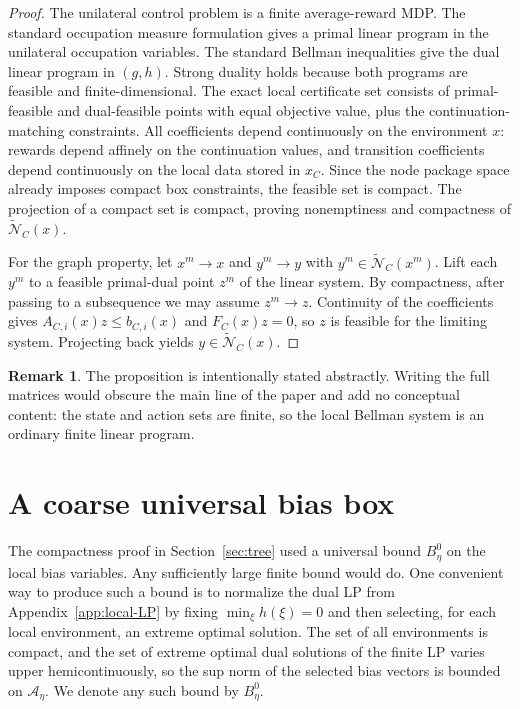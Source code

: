\documentclass[12pt]{article}
\theoremstyle{definition}
\newtheorem{remark}[theorem]{Remark}
\newcommand{\1}{\mathbf{1}}
\newcommand{\cA}{\mathcal{A}}
\newcommand{\cN}{\mathcal{N}}
\begin{document}
\begin{proof}
The unilateral control problem is a finite average-reward MDP.  The standard occupation
measure formulation gives a primal linear program in the unilateral occupation variables.
The standard Bellman inequalities give the dual linear program in \((g,h)\).  Strong
duality holds because both programs are feasible and finite-dimensional.  The exact local
certificate set consists of primal-feasible and dual-feasible points with equal objective
value, plus the continuation-matching constraints.  All coefficients depend continuously on
the environment \(x\): rewards depend affinely on the continuation values, and transition
coefficients depend continuously on the local data stored in \(x_C\).  Since the node
package space already imposes compact box constraints, the feasible set is compact.  The
projection of a compact set is compact, proving nonemptiness and compactness of
\(\widetilde{\cN}_C(x)\).

For the graph property, let \(x^m\to x\) and \(y^m\to y\) with
\(y^m\in \widetilde{\cN}_C(x^m)\).  Lift each \(y^m\) to a feasible primal-dual point
\(z^m\) of the linear system.  By compactness, after passing to a subsequence we may
assume \(z^m\to z\).  Continuity of the coefficients gives
\(A_{C,i}(x)z\le b_{C,i}(x)\) and \(F_C(x)z=0\), so \(z\) is feasible for the limiting
system.  Projecting back yields \(y\in \widetilde{\cN}_C(x)\).
\end{proof}

\begin{remark}
The proposition is intentionally stated abstractly.  Writing the full matrices would
obscure the main line of the paper and add no conceptual content: the state and action
sets are finite, so the local Bellman system is an ordinary finite linear program.
\end{remark}

\section{A coarse universal bias box}
\label{app:bias-box}

The compactness proof in Section~\ref{sec:tree} used a universal bound \(B_\eta^0\) on the
local bias variables.  Any sufficiently large finite bound would do.  One convenient way
to produce such a bound is to normalize the dual LP from Appendix~\ref{app:local-LP} by
fixing \(\min_\xi h(\xi)=0\) and then selecting, for each local environment, an extreme
optimal solution.  The set of all environments is compact, and the set of extreme optimal
dual solutions of the finite LP varies upper hemicontinuously, so the sup norm of the
selected bias vectors is bounded on \(\cA_\eta\).  We denote any such bound by
\(B_\eta^0\).
\end{document}
